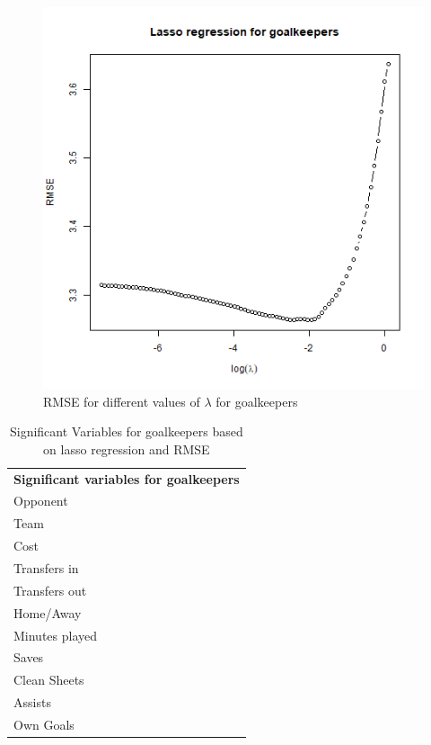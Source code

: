 \begin{figure}[H]
    \centering
    \includegraphics[scale=0.55]{fig/chapter_6/lasso_GLK.png}
    \caption{RMSE for different values of $\lambda$ for goalkeepers}
\label{fig:lasso_GLK}    
\end{figure}

\begin{table}[H]
\centering
\caption{Significant Variables for goalkeepers based on lasso regression and RMSE}
\label{tab:sig_var_GLK}
\begin{tabular}{l}
\textbf{Significant variables for goalkeepers }\\
Opponent                              \\
Team                                  \\
Cost                                  \\
Transfers in                          \\
Transfers out                         \\
Home/Away                             \\
Minutes played                        \\
Saves                                 \\
Clean Sheets                          \\
Assists                               \\
Own Goals                            
\end{tabular}
\end{table}

